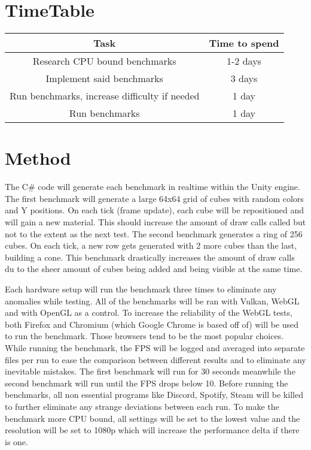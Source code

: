 \documentclass{article}
\begin{document}
\section {TimeTable}
\begin{center}
\begin{tabular}{ |c|c| }
\hline
\textbf {Task} & \textbf {Time to spend} \\
\hline
Research CPU bound benchmarks & 1-2 days \\
\hline
Implement said benchmarks & 3 days \\
\hline
Run benchmarks, increase difficulty if needed & 1 day \\
\hline
Run benchmarks & 1 day \\
\hline
\end{tabular}
\end{center}


\section {Method}
The C\# code will generate each benchmark in realtime within the Unity engine. The first benchmark will generate a large 64x64 grid of cubes with random colors and Y positions. On each tick (frame update), each cube will be repositioned and will gain a new material. This should increase the amount of draw calls called but not to the extent as the next test. The second benchmark generates a ring of 256 cubes. On each tick, a new row gets generated with 2 more cubes than the last, building a cone. This benchmark drastically increases the amount of draw calls du to the sheer amount of cubes being added and being visible at the same time.

Each hardware setup will run the benchmark three times to eliminate any anomalies while testing. All of the benchmarks will be ran with Vulkan, WebGL and with OpenGL as a control. To increase the reliability of the WebGL tests, both Firefox and Chromium (which Google Chrome is based off of) will be used to run the benchmark. Those browsers tend to be the most popular choices\cite{WebBrowsers}. While running the benchmark, the FPS will be logged and averaged into separate files per run to ease the comparison between different results and to eliminate any inevitable mistakes. The first benchmark will run for 30 seconds meanwhile the second benchmark will run until the FPS drops below 10. Before running the benchmarks, all non essential programs like Discord, Spotify, Steam will be killed to further eliminate any strange deviations between each run. To make the benchmark more CPU bound, all settings will be set to the lowest value and the resolution will be set to 1080p  which will increase the performance delta if there is one.
\end{document}
